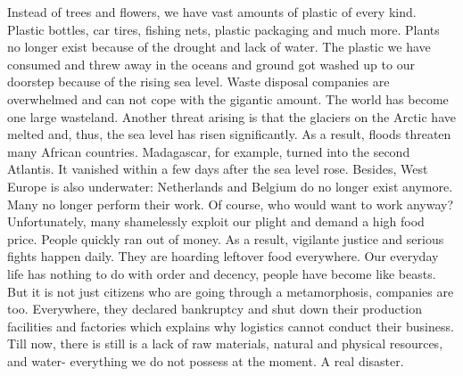 \documentclass[]{book}
\begin{document}
Instead of trees and flowers, we have vast amounts of plastic of every kind. Plastic bottles, car tires, fishing nets, plastic packaging and much more. Plants no longer exist because of the drought and lack of water. The plastic we have consumed and threw away in the oceans and ground got washed up to our doorstep because of the rising sea level. Waste disposal companies are overwhelmed and can not cope with the gigantic amount. The world has become one large wasteland. Another threat arising is that the glaciers on the Arctic have melted and, thus, the sea level has risen significantly. As a result, floods threaten many African countries. Madagascar, for example, turned into the second Atlantis. It vanished within a few days after the sea level rose. Besides, West Europe is also underwater: Netherlands and Belgium do no longer exist anymore. Many no longer perform their work. Of course, who would want to work anyway? Unfortunately, many shamelessly exploit our plight and demand a high food price. People quickly ran out of money. As a result, vigilante justice and serious fights happen daily. They are hoarding leftover food everywhere. Our everyday life has nothing to do with order and decency, people have become like beasts. But it is not just citizens who are going through a metamorphosis, companies are too. Everywhere, they declared bankruptcy and shut down their production facilities and factories which explains why logistics cannot conduct their business. Till now, there is still is a lack of raw materials, natural and physical resources, and water- everything we do not possess at the moment. A real disaster.
\end{document}
